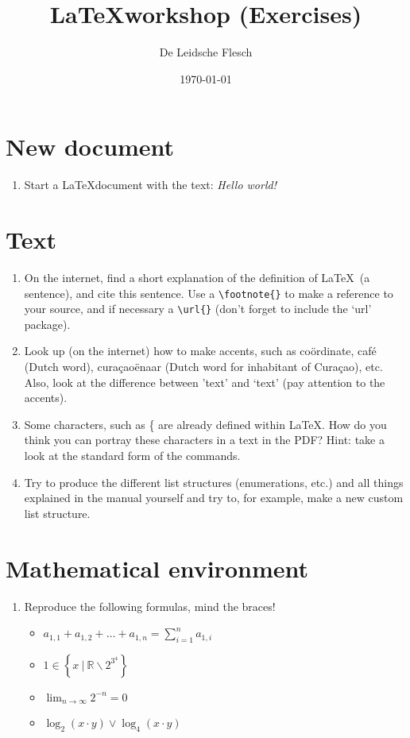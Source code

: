 \documentclass{article}
\begin{document}
\title{\LaTeX workshop (Exercises)}
\author{De Leidsche Flesch}
\date{\today}

\maketitle

\section{New document}
	\begin{enumerate}
		\item Start a \LaTeX document with the text: \emph{Hello world!}
	\end{enumerate}
	
\section{Text}
	\begin{enumerate}
		\item On the internet, find a short explanation of the definition of \LaTeX\ (a sentence), and cite this sentence. Use a \verb+\footnote{}+ to make a reference to your source, and if necessary a \verb+\url{}+ (don't forget to include the `url' package).
		\item Look up (on the internet) how to make accents, such as co\"ordinate, caf\'e (Dutch word), cura\c{c}ao\"enaar (Dutch word for inhabitant of Cura\c{c}ao), etc. Also, look at the difference between 'text' and `text' (pay attention to the accents).
		\item Some characters, such as \{ are already defined within \LaTeX. How do you think you can portray these characters in a text in the PDF? Hint: take a look at the standard form of the commands.
		\item Try to produce the different list structures (enumerations, etc.) and all things explained in the manual yourself and try to, for example, make a new custom list structure.
	\end{enumerate}


\section{Mathematical environment}
\begin{enumerate}
	\item Reproduce the following formulas, mind the braces!
	\begin{itemize}
		\renewcommand{\labelitemi}{\(\circ\)}
			\item\(a_{1,1} + a_{1,2} + \ldots + a_{1,n} = \displaystyle\sum_{i = 1}^n a_{1,i}\)\\
			\item\( 1 \in \left\{ x~|~\mathbb{R} \backslash 2^{3^4} \right\}\)\\
			\item\(\displaystyle\lim_{n \to \infty} 2^{-n} = 0\)\\
			\item\(\log_2(x\cdot y) \lor \log_4(x\cdot y)\)
		\end{itemize}
		
\end{enumerate}
\end{document}
